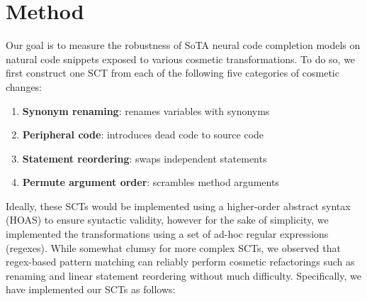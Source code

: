 \documentclass[usenames,dvipsnames]{article} %
\begin{document}


  \section{Method}

  Our goal is to measure the robustness of SoTA neural code completion models on natural code snippets exposed to various cosmetic transformations. To do so, we first construct one SCT from each of the following five categories of cosmetic changes:

  \begin{enumerate}[itemsep=1ex]
    \item \textbf{Synonym renaming}: renames variables with synonyms
    \item \textbf{Peripheral code}: introduces dead code to source code
    \item \textbf{Statement reordering}: swaps independent statements
    \item \textbf{Permute argument order}: scrambles method arguments
  \end{enumerate}

  Ideally, these SCTs would be implemented using a higher-order abstract syntax (HOAS) to ensure syntactic validity, however for the sake of simplicity, we implemented the transformations using a set of ad-hoc regular expressions (regexes). While somewhat clumsy for more complex SCTs, we observed that regex-based pattern matching can reliably perform cosmetic refactorings such as renaming and linear statement reordering without much difficulty. Specifically, we have implemented our SCTs as follows:
\end{document}
